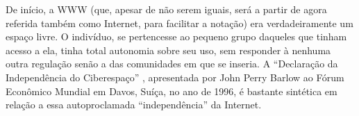 De início, a WWW (que, apesar de não serem iguais, será a partir de agora referida também como Internet, para facilitar a notação) era verdadeiramente um espaço livre.
O indivíduo, se pertencesse ao pequeno grupo daqueles que tinham acesso a ela, tinha total autonomia sobre seu uso, sem responder à nenhuma outra regulação senão a das comunidades em que se inseria.
A ``Declaração da Independência do Ciberespaço'' \cite{barlow_declaration_1996}, apresentada por John Perry Barlow ao Fórum Econômico Mundial em Davos, Suíça, no ano de 1996, é bastante sintética em relação a essa autoproclamada ``independência'' da Internet.

